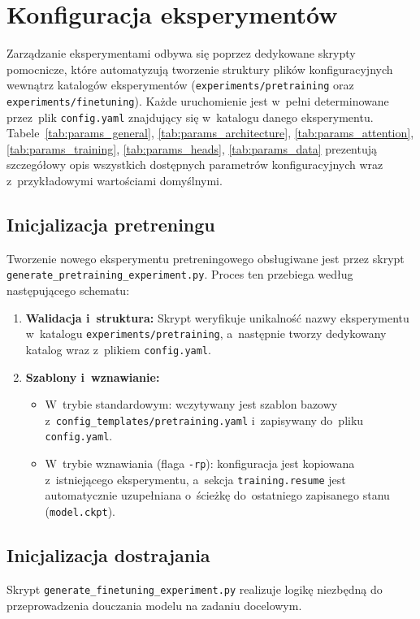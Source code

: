 \documentclass[a4paper,11pt,twoside]{report}
\theoremstyle{definition}
\begin{document}
\section{Konfiguracja eksperymentów}\label{sec:experiments_config}

Zarządzanie eksperymentami odbywa się poprzez dedykowane skrypty pomocnicze, które automatyzują tworzenie struktury plików konfiguracyjnych wewnątrz katalogów eksperymentów (\texttt{experiments/pretraining} oraz \texttt{experiments/finetuning}). Każde uruchomienie jest w~pełni determinowane przez~plik \texttt{config.yaml} znajdujący się w~katalogu danego eksperymentu. Tabele~\ref{tab:params_general}, \ref{tab:params_architecture}, \ref{tab:params_attention}, \ref{tab:params_training}, \ref{tab:params_heads}, \ref{tab:params_data} prezentują szczegółowy opis wszystkich dostępnych parametrów konfiguracyjnych wraz z~przykładowymi wartościami domyślnymi.

\subsection{Inicjalizacja pretreningu}
Tworzenie nowego eksperymentu pretreningowego obsługiwane jest przez skrypt \texttt{generate\_pretraining\_experiment.py}. Proces ten przebiega według następującego schematu:
\begin{enumerate}
    \item \textbf{Walidacja i~struktura:} Skrypt weryfikuje unikalność nazwy eksperymentu w~katalogu \texttt{experiments/pretraining}, a~następnie tworzy dedykowany katalog wraz z~plikiem \texttt{config.yaml}.
    \item \textbf{Szablony i~wznawianie:}
    \begin{itemize}
        \item W~trybie standardowym: wczytywany jest szablon bazowy z~\texttt{config\_templates/pretraining.yaml} i~zapisywany do~pliku \texttt{config.yaml}.
        \item W~trybie wznawiania (flaga \texttt{-rp}): konfiguracja jest kopiowana z~istniejącego eksperymentu, a~sekcja \texttt{training.resume} jest automatycznie uzupełniana o~ścieżkę do~ostatniego zapisanego stanu (\texttt{model.ckpt}).
    \end{itemize}
\end{enumerate}

\subsection{Inicjalizacja dostrajania}
Skrypt \texttt{generate\_finetuning\_experiment.py} realizuje logikę niezbędną do przeprowadzenia douczania modelu na zadaniu docelowym. 
\end{document}

